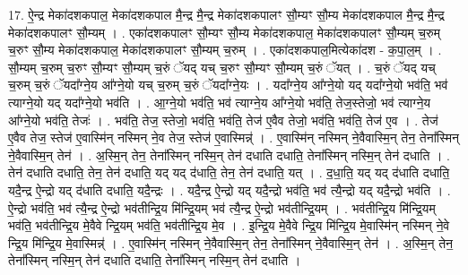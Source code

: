 \documentclass[17pt]{extarticle}
\begin{document}
17. ऐ॒न्द्र मेका॑दशकपाल॒ मेका॑दशकपाल मै॒न्द्र मै॒न्द्र मेका॑दशकपालꣳ सौ॒म्यꣳ सौ॒म्य मेका॑दशकपाल मै॒न्द्र मै॒न्द्र मेका॑दशकपालꣳ सौ॒म्यम् । . एका॑दशकपालꣳ सौ॒म्यꣳ सौ॒म्य मेका॑दशकपाल॒ मेका॑दशकपालꣳ सौ॒म्यम् च॒रुम् च॒रुꣳ सौ॒म्य मेका॑दशकपाल॒ मेका॑दशकपालꣳ सौ॒म्यम् च॒रुम् । . एका॑दशकपाल॒मित्येका॑दश - क॒पा॒ल॒म् । . सौ॒म्यम् च॒रुम् च॒रुꣳ सौ॒म्यꣳ सौ॒म्यम् च॒रुं ॅयद् यच् च॒रुꣳ सौ॒म्यꣳ सौ॒म्यम् च॒रुं ॅयत् । . च॒रुं ॅयद् यच् च॒रुम् च॒रुं ॅयदा᳚ग्ने॒य आ᳚ग्ने॒यो यच् च॒रुम् च॒रुं ॅयदा᳚ग्ने॒यः । . यदा᳚ग्ने॒य आ᳚ग्ने॒यो यद् यदा᳚ग्ने॒यो भव॑ति॒ भव॑ त्याग्ने॒यो यद् यदा᳚ग्ने॒यो भव॑ति । . आ॒ग्ने॒यो भव॑ति॒ भव॑ त्याग्ने॒य आ᳚ग्ने॒यो भव॑ति॒ तेज॒स्तेजो॒ भव॑ त्याग्ने॒य आ᳚ग्ने॒यो भव॑ति॒ तेजः॑ । . भव॑ति॒ तेज॒ स्तेजो॒ भव॑ति॒ भव॑ति॒ तेज॑ ए॒वैव तेजो॒ भव॑ति॒ भव॑ति॒ तेज॑ ए॒व । . तेज॑ ए॒वैव तेज॒ स्तेज॑ ए॒वास्मि॑न् नस्मिन् ने॒व तेज॒ स्तेज॑ ए॒वास्मिन्न्॑ । . ए॒वास्मि॑न् नस्मिन् ने॒वैवास्मि॒न् तेन॒ तेना᳚स्मिन् ने॒वैवास्मि॒न् तेन॑ । . अ॒स्मि॒न् तेन॒ तेना᳚स्मिन् नस्मि॒न् तेन॑ दधाति दधाति॒ तेना᳚स्मिन् नस्मि॒न् तेन॑ दधाति । . तेन॑ दधाति दधाति॒ तेन॒ तेन॑ दधाति॒ यद् यद् द॑धाति॒ तेन॒ तेन॑ दधाति॒ यत् । . द॒धा॒ति॒ यद् यद् द॑धाति दधाति॒ यदै॒न्द्र ऐ॒न्द्रो यद् द॑धाति दधाति॒ यदै॒न्द्रः । . यदै॒न्द्र ऐ॒न्द्रो यद् यदै॒न्द्रो भव॑ति॒ भव॑ त्यै॒न्द्रो यद् यदै॒न्द्रो भव॑ति । . ऐ॒न्द्रो भव॑ति॒ भव॑ त्यै॒न्द्र ऐ॒न्द्रो भव॑तीन्द्रि॒य मि॑न्द्रि॒यम् भव॑ त्यै॒न्द्र ऐ॒न्द्रो भव॑तीन्द्रि॒यम् । . भव॑तीन्द्रि॒य मि॑न्द्रि॒यम् भव॑ति॒ भव॑तीन्द्रि॒य मे॒वैवे न्द्रि॒यम् भव॑ति॒ भव॑तीन्द्रि॒य मे॒व । . इ॒न्द्रि॒य मे॒वैवे न्द्रि॒य मि॑न्द्रि॒य मे॒वास्मि॑न् नस्मिन् ने॒वे न्द्रि॒य मि॑न्द्रि॒य मे॒वास्मिन्न्॑ । . ए॒वास्मि॑न् नस्मिन् ने॒वैवास्मि॒न् तेन॒ तेना᳚स्मिन् ने॒वैवास्मि॒न् तेन॑ । . अ॒स्मि॒न् तेन॒ तेना᳚स्मिन् नस्मि॒न् तेन॑ दधाति दधाति॒ तेना᳚स्मिन् नस्मि॒न् तेन॑ दधाति । \newline
\end{document}
